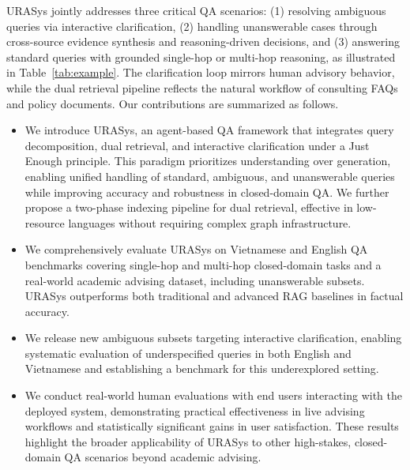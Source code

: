 \documentclass[11pt]{article}
\begin{document}
URASys jointly addresses three critical QA scenarios: (1) resolving ambiguous queries via interactive clarification, (2) handling unanswerable cases through cross-source evidence synthesis and reasoning-driven decisions, and (3) answering standard queries with grounded single-hop or multi-hop reasoning, as illustrated in Table~\ref{tab:example}. The clarification loop mirrors human advisory behavior, while the dual retrieval pipeline reflects the natural workflow of consulting FAQs and policy documents. Our contributions are summarized as follows.

\begin{itemize}
    \item We introduce URASys, an agent-based QA framework that integrates query decomposition, dual retrieval, and interactive clarification under a Just Enough principle. This paradigm prioritizes understanding over generation, enabling unified handling of standard, ambiguous, and unanswerable queries while improving accuracy and robustness in closed-domain QA. We further propose a two-phase indexing pipeline for dual retrieval, effective in low-resource languages without requiring complex graph infrastructure.

    \item We comprehensively evaluate URASys on Vietnamese and English QA benchmarks covering single-hop and multi-hop closed-domain tasks and a real-world academic advising dataset, including unanswerable subsets. URASys outperforms both traditional and advanced RAG baselines in factual accuracy.


    \item We release new ambiguous subsets targeting interactive clarification, enabling systematic evaluation of underspecified queries in both English and Vietnamese and establishing a benchmark for this underexplored setting.

    \item We conduct real-world human evaluations with end users interacting with the deployed system, demonstrating practical effectiveness in live advising workflows and statistically significant gains in user satisfaction. These results highlight the broader applicability of URASys to other high-stakes, closed-domain QA scenarios beyond academic advising.
\end{itemize}



\end{document}
